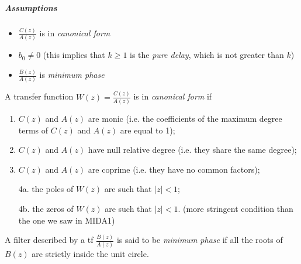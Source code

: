 \subparagraph{Assumptions}
\begin{itemize}
    \item $\frac{C(z)}{A(z)}$ is in \emph{canonical form}
    \item $b_0\ne 0$ (this implies that $k \ge 1$ is the \emph{pure delay}, which is not greater than $k$)
    \item $\frac{B(z)}{A(z)}$ is \emph{minimum phase}
\end{itemize}

\begin{recall}
    A transfer function $W(z) = \frac{C(z)}{A(z)}$ is in \emph{canonical form} if 
    \begin{enumerate}
        \item $C(z)$ and $A(z)$ are monic (i.e. the coefficients of the maximum degree terms of $C(z)$ and $A(z)$ are equal to 1);
        \item $C(z)$ and $A(z)$ have null relative degree (i.e. they share the same degree);
        \item $C(z)$ and $A(z)$ are coprime (i.e. they have no common factors);
        \item[4a.]the poles of $W(z)$ are such that $|z| < 1$;
        \item[4b.]the zeros of $W(z)$ are such that $|z| < 1$. (more stringent condition than the one we saw in MIDA1)
    \end{enumerate}
\end{recall}

\begin{recall}
    A filter described by a \gls{tf} $\frac{B(z)}{A(z)}$ is said to be \emph{minimum phase} if all the roots of $B(z)$ are strictly inside the unit circle.
\end{recall}

